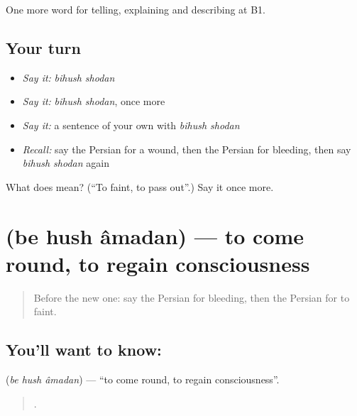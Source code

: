 \begin{grammarlens}[title={What you've built}]
One more word for telling, explaining and describing at B1.
\end{grammarlens}

\subsection*{Your turn}
\begin{itemize}
\raggedright
  \item \emph{Say it:} \emph{bihush shodan}
  \item \emph{Say it:} \emph{bihush shodan}, once more
  \item \emph{Say it:} a sentence of your own with \emph{bihush shodan}
  \item \emph{Recall:} say the Persian for a wound, then the Persian for bleeding, then say \emph{bihush shodan} again
\end{itemize}

\begin{tcolorbox}[breakable,colback=teal!4,colframe=teal!35!black,title={Before you move on}]
What does   mean? (\textquotedblleft{}To faint, to pass out\textquotedblright{}.) Say it once more.
\end{tcolorbox}
\section[\texorpdfstring{\fa{به} \fa{هوش} \fa{آمدن} (be hush âmadan)}{به هوش آمدن (be hush âmadan)}]{   (be hush âmadan) — to come round, to regain consciousness}

\label{lesson:FA-C326-be-hush-amadan}



\begin{quote}
Before the new one: say the Persian for bleeding, then the Persian for to faint.
\end{quote}

\subsection*{You'll want to know:   }
\textbf{  } (\emph{be hush âmadan}) — \textquotedblleft{}to come round, to regain consciousness\textquotedblright{}.

\begin{quote}
       .
\end{quote}

